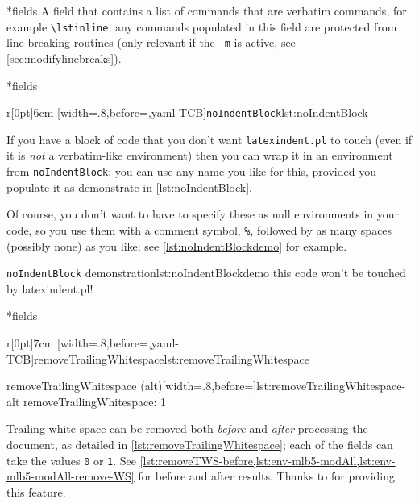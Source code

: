 *{fields}
	A field that contains a list of commands that are verbatim commands, for example \lstinline|\lstinline|; any commands populated in this field are protected from line breaking routines (only relevant if the \texttt{-m} is active, see \vref{sec:modifylinebreaks}).

*{fields}

	\begin{wrapfigure}[8]{r}[0pt]{6cm}
		[width=.8\linewidth,before=\centering,yaml-TCB]{\texttt{noIndentBlock}}{lst:noIndentBlock}
	\end{wrapfigure}
	If you have a block of code that you don't want \texttt{latexindent.pl} to touch (even if it is \emph{not} a verbatim-like environment) then you can wrap it in an environment from \texttt{noIndentBlock}; you can use any name you like for this, provided you populate it as demonstrate in \cref{lst:noIndentBlock}.

	Of course, you don't want to have to specify these as null environments in your code, so you use them with a comment symbol, \lstinline!%!, followed by as many spaces (possibly none) as you like; see \cref{lst:noIndentBlockdemo} for example.

	\begin{cmhlistings}[style=demo,escapeinside={(*@}{@*)}]{\texttt{noIndentBlock} demonstration}{lst:noIndentBlockdemo}
        this code
                won't
     be touched
                    by
             latexindent.pl!
	\end{cmhlistings}

*{fields}\label{yaml:removeTrailingWhitespace}

	\begin{wrapfigure}[10]{r}[0pt]{7cm}
		[width=.8\linewidth,before=\centering,yaml-TCB]{removeTrailingWhitespace}{lst:removeTrailingWhitespace}

		\vspace{.1cm}
		\begin{yaml}[numbers=none]{removeTrailingWhitespace (alt)}[width=.8\linewidth,before=\centering]{lst:removeTrailingWhitespace-alt}
removeTrailingWhitespace: 1
\end{yaml}
	\end{wrapfigure}
	Trailing white space can be removed both \emph{before} and \emph{after} processing the document, as detailed in \cref{lst:removeTrailingWhitespace}; each of the fields can take the values \texttt{0} or \texttt{1}.
	See \vref{lst:removeTWS-before,lst:env-mlb5-modAll,lst:env-mlb5-modAll-remove-WS} for before and after results.
	Thanks to \cite{vosskuhle} for providing this feature.

